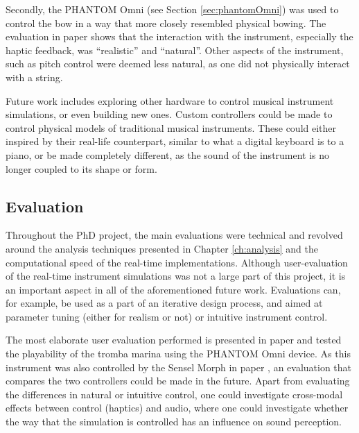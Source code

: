 Secondly, the PHANTOM Omni (see Section \ref{sec:phantomOmni}) was used to control the bow in a way that more closely resembled physical bowing. The evaluation in paper \citeP[E] shows that the interaction with the instrument, especially the haptic feedback, was ``realistic'' and ``natural''. Other aspects of the instrument, such as pitch control were deemed less natural, as one did not physically interact with a string. 

Future work includes exploring other hardware to control musical instrument simulations, or even building new ones. Custom controllers could be made to control physical models of traditional musical instruments. 
These could either inspired by their real-life counterpart, similar to what a digital keyboard is to a piano, or be made completely different, as the sound of the instrument is no longer coupled to its shape or form.




\subsection{Evaluation}
Throughout the PhD project, the main evaluations were technical and revolved around the analysis techniques presented in Chapter \ref{ch:analysis} and the computational speed of the real-time implementations.
Although user-evaluation of the real-time instrument simulations was not a large part of this project, it is an important aspect in all of the aforementioned future work. Evaluations can, for example, be used as a part of an iterative design process, and aimed at parameter tuning (either for realism or not) or intuitive instrument control.

The most elaborate user evaluation performed is presented in paper \citeP[E] and tested the playability of the tromba marina using the PHANTOM Omni device. As this instrument was also controlled by the Sensel Morph in paper \citeP[D], an evaluation that compares the two controllers could be made in the future. Apart from evaluating the differences in natural or intuitive control, one could investigate cross-modal effects between control (haptics) and audio, where one could investigate whether the way that the simulation is controlled has an influence on sound perception.

